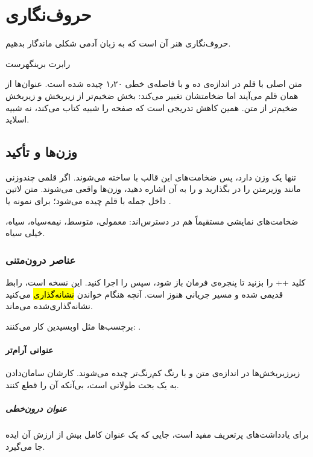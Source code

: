\chapter{حروف‌نگاری}
\label{cha:typography}
\epigraph{حروف‌نگاری هنر آن است که به زبان آدمی شکلی ماندگار بدهیم.}{رابرت برینگهرست}

متن اصلی با قلم  در اندازه‌ی ده و با فاصله‌ی خطی ۱٫۲۰ چیده شده
است. عنوان‌ها از همان قلم می‌آیند اما ضخامتشان تغییر می‌کند: بخش ضخیم‌تر از
زیربخش و زیربخش ضخیم‌تر از متن. همین کاهش تدریجی است که صفحه را شبیه کتاب
می‌کند، نه شبیه اسلاید.

\section{وزن‌ها و تأکید}

 تنها یک وزن دارد، پس ضخامت‌های این قالب با
 ساخته می‌شوند. اگر قلمی چندوزنی مانند وزیرمتن را در
 بگذارید و  را به آن
اشاره دهید، وزن‌ها واقعی می‌شوند. متن لاتین داخل جمله با قلم 
چیده می‌شود؛ برای نمونه  یا
.

ضخامت‌های نمایشی مستقیماً هم در دسترس‌اند:
{\displaybook معمولی}، {\displaymed متوسط}، {\displaysemi نیمه‌سیاه}،
{\displaybold سیاه}، {\displayblack خیلی سیاه}.

\subsection{عناصر درون‌متنی}

کلید ++ را بزنید تا پنجره‌ی فرمان باز شود، سپس
 را اجرا کنید. این نسخه 
است، رابط قدیمی  شده و مسیر جریانی هنوز
 است. آنچه هنگام خواندن \hl{نشانه‌گذاری} می‌کنید
نشانه‌گذاری‌شده می‌ماند.

برچسب‌ها مثل اوبسیدین کار می‌کنند: 
 .

\subsubsection{عنوانی آرام‌تر}

زیرزیربخش‌ها در اندازه‌ی متن و با رنگ کم‌رنگ‌تر چیده می‌شوند. کارشان
سامان‌دادن به یک بحث طولانی است، بی‌آنکه آن را قطع کنند.

\paragraph{عنوان درون‌خطی} برای یادداشت‌های پرتعریف مفید است، جایی که یک
عنوان کامل بیش از ارزش آن ایده جا می‌گیرد.

